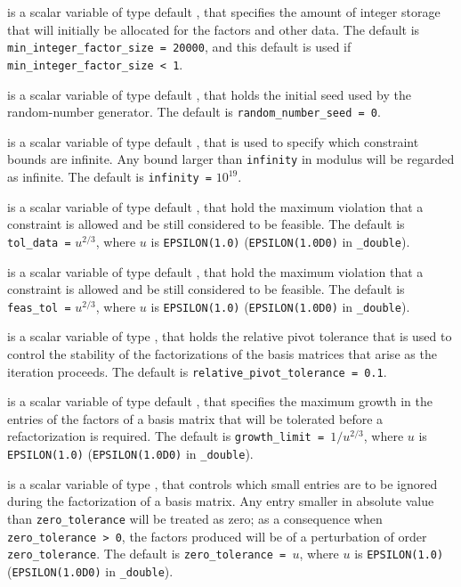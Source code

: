 \begin{description}
 is a scalar variable of type default \integer,
that specifies the amount of integer storage that will initially be
allocated for the factors and other data.
The default is {\tt min\_integer\_factor\_size = 20000},
and this default is used if {\tt min\_integer\_factor\_size < 1}.

 is a scalar variable of type default \integer,
that holds the initial seed used by the random-number generator.
The default is {\tt random\_number\_seed = 0}.

 is a scalar variable of type default \realdp, that is used to
specify which constraint bounds are infinite.
Any bound larger than {\tt infinity} in modulus will be regarded as infinite.
The default is {\tt infinity =} $10^{19}$.

 is a scalar variable of type default \realdp, that hold the
maximum violation that a constraint is allowed and be still considered to be
feasible.
The default is {\tt tol\_data =} $u^{2/3}$,
where $u$ is {\tt EPSILON(1.0)} ({\tt EPSILON(1.0D0)} in
{\tt \fullpackagename\_double}).

 is a scalar variable of type default \realdp, that hold the
maximum violation that a constraint is allowed and be still considered to be
feasible.
The default is {\tt feas\_tol =} $u^{2/3}$,
where $u$ is {\tt EPSILON(1.0)} ({\tt EPSILON(1.0D0)} in
{\tt \fullpackagename\_double}).

 is a scalar variable of type \realdp,
that holds the relative pivot tolerance that is used to control the
stability of the factorizations of the basis matrices that arise as the
iteration proceeds.
The default is {\tt relative\_pivot\_tolerance = 0.1}.

 is a scalar variable of type default \realdp, that
specifies the maximum growth in the entries of the factors of a basis
matrix that will be tolerated before a refactorization is required.
The default is {\tt growth\_limit = $1/u^{2/3}$},
where $u$ is {\tt EPSILON(1.0)} ({\tt EPSILON(1.0D0)} in
{\tt \fullpackagename\_double}).

 is a scalar variable of type \realdp, that
controls which small entries are to be ignored during the factorization
of a basis matrix. Any entry smaller in absolute value than
{\tt zero\_\-tolerance} will be treated as zero; as a consequence when
{\tt zero\_tolerance > 0}, the factors produced will be of a perturbation
of order {\tt zero\_tolerance}.
The default is {\tt zero\_tolerance = $u$},
where $u$ is {\tt EPSILON(1.0)} ({\tt EPSILON(1.0D0)} in
{\tt \fullpackagename\_double}).


\end{description}
